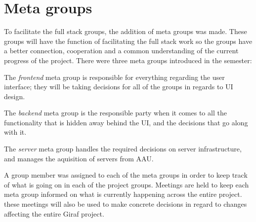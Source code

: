 \section{Meta groups}\label{SEC:MetaGroups}
To facilitate the full stack groups, the addition of meta groups was made.
These groups will have the function of facilitating the full stack work so the groups have a better connection, cooperation and a common understanding of the current progress of the project.
There were three meta groups introduced in the semester:

The \textit{frontend} meta group is responsible for everything regarding the user interface; they will be taking decisions for all of the groups in regards to UI design.

The \textit{backend} meta group is the responsible party when it comes to all the functionality that is hidden away behind the UI, and the decisions that go along with it.

The \textit{server} meta group handles the required decisions on server infrastructure, and manages the aquisition of servers from AAU.

A group member was assigned to each of the meta groups in order to keep track of what is going on in each of the project groups. 
Meetings are held to keep each meta group informed on what is currently happening across the entire project. 
these meetings will also be used to make concrete decisions in regard to changes affecting the entire Giraf project.
